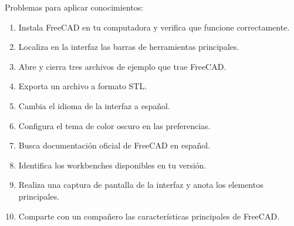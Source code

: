 Problemas para aplicar conocimientos:
\begin{enumerate}
	\item Instala FreeCAD en tu computadora y verifica que
	      funcione correctamente.
	\item Localiza en la interfaz las barras de herramientas
	      principales.
	\item Abre y cierra tres archivos de ejemplo que trae
	      FreeCAD.
	\item Exporta un archivo a formato STL.
	\item Cambia el idioma de la interfaz a español.
	\item Configura el tema de color oscuro en las preferencias.
	\item Busca documentación oficial de FreeCAD en español.
	\item Identifica los workbenches disponibles en tu versión.
	\item Realiza una captura de pantalla de la interfaz y
	      anota los elementos principales.
	\item Comparte con un compañero las características
	      principales de FreeCAD.
\end{enumerate}